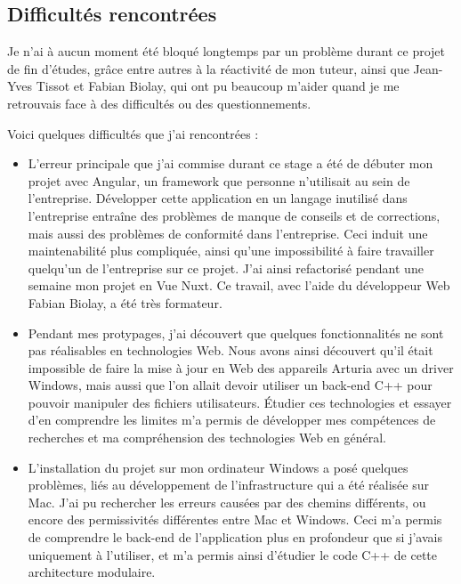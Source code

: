 \documentclass[francais]{rapportPFE}  %
\begin{document}
\subsection{Difficultés rencontrées}
Je n'ai à aucun moment été bloqué longtemps par un problème durant ce projet de fin d'études, grâce entre autres à la réactivité de mon tuteur, ainsi que Jean-Yves Tissot et Fabian Biolay, qui ont pu beaucoup m'aider quand je me retrouvais face à des difficultés ou des questionnements. 

Voici quelques difficultés que j'ai rencontrées : 
\begin{itemize}
    \item L'erreur principale que j'ai commise durant ce stage a été de débuter mon projet avec Angular, un framework que personne n'utilisait au sein de l'entreprise. Développer cette application en un langage inutilisé dans l'entreprise entraîne des problèmes de manque de conseils et de corrections, mais aussi des problèmes de conformité dans l'entreprise. Ceci induit une maintenabilité plus compliquée, ainsi qu'une impossibilité à faire travailler quelqu'un de l'entreprise sur ce projet. J'ai ainsi refactorisé pendant une semaine mon projet en Vue Nuxt. Ce travail, avec l'aide du développeur Web Fabian Biolay, a été très formateur.
    \item Pendant mes protypages, j'ai découvert que quelques fonctionnalités ne sont pas réalisables en technologies Web. Nous avons ainsi découvert qu'il était impossible de faire la mise à jour en Web des appareils Arturia avec un driver Windows, mais aussi que l'on allait devoir utiliser un back-end C++ pour pouvoir manipuler des fichiers utilisateurs. Étudier ces technologies et essayer d'en comprendre les limites m'a permis de développer mes compétences de recherches et ma compréhension des technologies Web en général.
    \item L'installation du projet sur mon ordinateur Windows a posé quelques problèmes, liés au développement de l'infrastructure qui a été réalisée sur Mac. J'ai pu rechercher les erreurs causées par des chemins différents, ou encore des permissivités différentes entre Mac et Windows. Ceci m'a permis de comprendre le back-end de l'application plus en profondeur que si j'avais uniquement à l'utiliser, et m'a permis ainsi d'étudier le code C++ de cette architecture modulaire.

\end{itemize}
\end{document}
